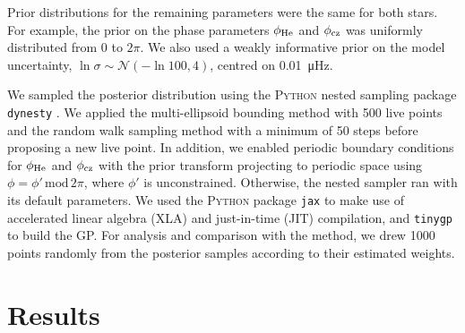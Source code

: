 Prior distributions for the remaining parameters were the same for both stars. For example, the prior on the phase parameters \(\phi_{{\mathrm{He}}}\) and \(\phi_{{\mathrm{cz}}}\) was uniformly distributed from 0 to \(2\pi\). We also used a weakly informative prior on the model uncertainty, \(\ln\sigma \sim \mathcal{N}( - \ln 100, 4)\), centred on \SI{0.01}{\micro\hertz}.

We sampled the posterior distribution using the \textsc{Python} nested sampling package \texttt{dynesty} \citep{Speagle2020,Koposov.Speagle.ea2023}. We applied the multi-ellipsoid bounding method \citep{Feroz.Hobson.ea2009} with 500 live points and the random walk sampling method \citep{Skilling2006} with a minimum of 50 steps before proposing a new live point. In addition, we enabled periodic boundary conditions for \(\phi_{{\mathrm{He}}}\) and \(\phi_{{\mathrm{cz}}}\) with the prior transform projecting to periodic space using \(\phi = \phi'\,\mathrm{mod}\,2\pi\), where \(\phi'\) is unconstrained. Otherwise, the nested sampler ran with its default parameters. We used the \textsc{Python} package \texttt{jax} \citep{Bradbury.Frostig.ea2018} to make use of accelerated linear algebra (XLA) and just-in-time (JIT) compilation, and \texttt{tinygp} \citep{Foreman-Mackey.Yadav.ea2022} to build the GP. For analysis and comparison with the  method, we drew 1000 points randomly from the posterior samples according to their estimated weights.


\section{Results}\label{sec:glitch-results}


